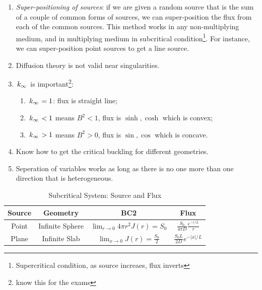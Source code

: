 \documentclass{school-22.211-notes}
\begin{document}
\clearpage
{}
\begin{enumerate}
\item \textit{Super-positioning of sources}: if we are given a random source that is the sum of a couple of common forms of sources, we can super-position the flux from each of the common sources. This method works in any non-multiplying medium, and in multiplying medium in subcritical condition\footnote{Supercritical condition, as source increaes, flux inverts}. For instance, we can super-position point sources to get a line source. 
\item Diffusion theory is not valid near singularities. 
\item $\left. k_{\infty} \right.$ is important\footnote{know this for the exams}: 
  \begin{enumerate}
  \item $\left. k_{\infty} \right. = 1$: flux is straight line;
  \item $\left. k_{\infty} \right. < 1$ means $B^2 < 1$, flux is $\sinh, \cosh$ which is convex; 
  \item $\left. k_{\infty} \right. > 1$ means $B^2 > 0$, flux is $\sin, \cos$ which is concave. 
  \end{enumerate}
\item Know how to get the critical buckling for different geometries. 
\item Seperation of variables works as long as there is no one more than one direction that is heterogeneous. 
\end{enumerate}

  \begin{table}
    \centering
    \begin{tabular}{|c|c|c|c|} \hline
      Source & Geometry & BC2 & Flux \\ \hline \hline
      Point & Infinite Sphere &$\lim_{r\to 0} 4 \pi r^2 J(r) = S_0$ & $\frac{S_0}{4\pi D} \frac{e^{-r/L}}{r}$ \\ \hline
      Plane & Infinite Slab & $\lim_{x\to 0} J(r)  = \frac{S_0}{2}$ & $\frac{S_0 L}{2D} e^{-|x|/L}$ \\ \hline
    \end{tabular}
    \caption{Subcritical System: Source and Flux} 
  \end{table}
  
  
\end{document}
